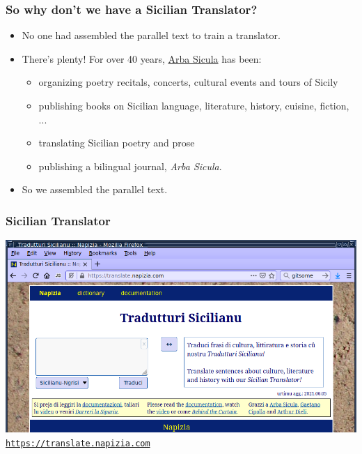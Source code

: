 \documentclass{beamer}
\begin{document}

\begin{frame}
  \frametitle{So why don't we have a Sicilian Translator?}
  \vspace{-1.0em}
  \begin{itemize}
  \item No one had assembled the parallel text to train a translator.
    \vspace{1em}
    \item There's plenty!  For over 40 years, \href{http://www.arbasicula.org/}{Arba Sicula} has been:
    \begin{itemize}
    \item organizing poetry recitals, concerts, cultural events and tours of Sicily
    \item publishing books on Sicilian language, literature, history, cuisine, fiction, ...
    \item translating Sicilian poetry and prose
    \item publishing a bilingual journal, \textit{Arba Sicula}.
    \end{itemize}
  \vspace{1em}
  \item So we assembled the parallel text.
  \end{itemize} 
\end{frame}


\begin{frame}
  \frametitle{Sicilian Translator}
  \vspace{-1.0em}
  \href{https://translate.napizia.com}{%
    \includegraphics[width=\textwidth]{images/browser-white-box-new_v1.png}
  }
  \vspace{-1.0em}
  \hspace{-7.0pt}
  \footnotesize{\href{https://translate.napizia.com}{\texttt{https://translate.napizia.com}}}
\end{frame}
\end{document}
